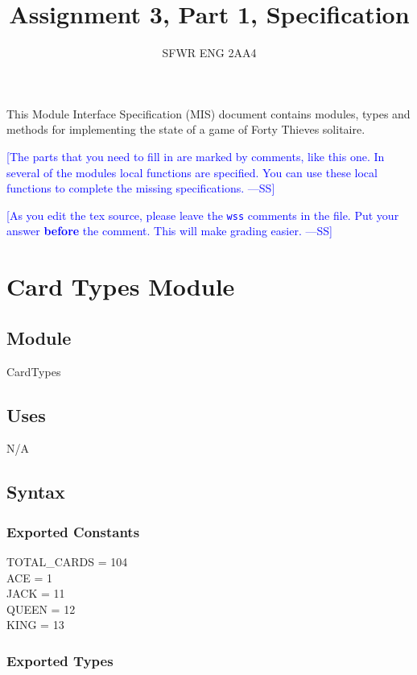 \documentclass[12pt]{article}
\title{Assignment 3, Part 1, Specification}
\author{SFWR ENG 2AA4}
\newcommand{\authornote}[3]{\textcolor{#1}{[#3 ---#2]}}
\newcommand{\authornote}[3]{}
\newcommand{\wss}[1]{\authornote{blue}{SS}{#1}}
\begin{document}
\maketitle
This Module Interface Specification (MIS) document contains modules, types and
methods for implementing the state of a game of Forty Thieves solitaire.

\wss{The parts that you need to fill in are marked by comments, like this one.
  In several of the modules local functions are specified.  You can use these
  local functions to complete the missing specifications.}

\wss{As you edit the tex source, please leave the \texttt{wss} comments in the
  file.  Put your answer \textbf{before} the comment.  This will make grading
  easier.}

\newpage

\section* {Card Types Module}

\subsection*{Module}

CardTypes

\subsection* {Uses}

N/A

\subsection* {Syntax}

\subsubsection* {Exported Constants}

TOTAL\_CARDS = 104\\
ACE = 1\\
JACK = 11\\
QUEEN = 12\\
KING = 13

\subsubsection* {Exported Types}
\end{document}
